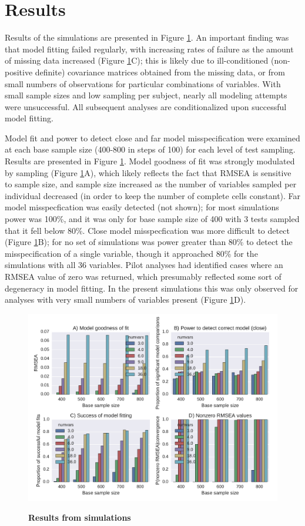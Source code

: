 \documentclass[11pt, oneside]{article}   	%
\begin{document}
\section{Results}

Results of the simulations are presented in Figure \ref{fig:results}.  An important finding was that model fitting failed regularly, with increasing rates of failure as the amount of missing data increased (Figure \ref{fig:results}C); this is likely due to ill-conditioned (non-positive definite) covariance matrices obtained from the missing data, or from small numbers of observations for particular combinations of variables.   With small sample sizes and low sampling per subject, nearly all modeling attempts were unsuccessful.  All subsequent analyses are conditionalized upon successful model fitting.

Model fit and power to detect close and far model misspecification were examined at each base sample size (400-800 in steps of 100) for each level of test sampling.  Results are presented in Figure \ref{fig:results}.  Model goodness of fit was strongly modulated by sampling (Figure \ref{fig:results}A), which likely reflects the fact that RMSEA is sensitive to sample size, and sample size increased as the number of variables sampled per individual decreased (in order to keep the number of complete cells constant).  Far model misspecfication was easily detected (not shown); for most simulations power was 100\%, and it was only for base sample size of 400 with 3 tests sampled that it fell below 80\%.  Close model misspecfication was more difficult to detect (Figure \ref{fig:results}B); for no set of simulations was power greater than 80\% to detect the misspecification of a single variable, though it approached 80\% for the simulations with all 36 variables.  Pilot analyses had identified cases where an RMSEA value of zero was returned, which presumably reflected some sort of degeneracy in model fitting.  In the present simulations this was only observed for analyses with very small numbers of variables present (Figure \ref{fig:results}D).  


\begin{figure}[!h]
\caption{\textbf{Results from simulations}}
\centering
\includegraphics[width=1.\linewidth]{results_power.pdf}
\label{fig:results}
\end{figure}
\end{document}
